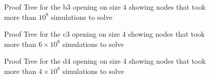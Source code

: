 \begin{figure}
\centering

\caption[Proof Tree for the b3 Opening on Size 4]{Proof Tree for the b3 opening on size 4 showing nodes that took more than $10^8$ simulations to solve}
\label{fig:proof-b3}
\end{figure}

\begin{figure}
\centering

\caption[Proof Tree for the c3 Opening on Size 4]{Proof Tree for the c3 opening on size 4 showing nodes that took more than $6 \times 10^8$ simulations to solve}
\label{fig:proof-c3}
\end{figure}

\begin{figure}
\centering

\caption[Proof Tree for the d4 Opening on Size 4]{Proof Tree for the d4 opening on size 4 showing nodes that took more than $4 \times 10^8$ simulations to solve}
\label{fig:proof-d4}
\end{figure}

